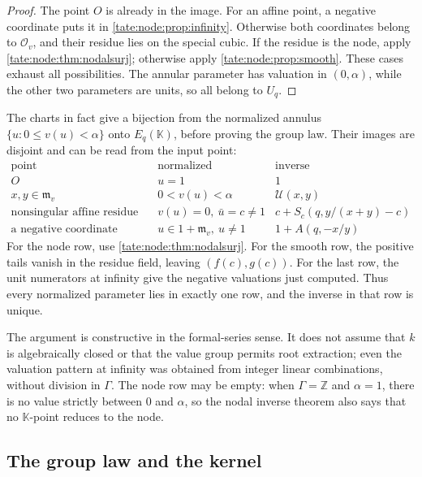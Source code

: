 \documentclass[11pt,letterpaper]{article}
\theoremstyle{definition}
\newcommand{\Z}{\mathbb Z}
\newcommand{\m}{\mathfrak m}
\newcommand{\OO}{\mathcal O}
\newcommand{\UU}{\mathcal U}
\newcommand{\KK}{\mathbb K}
\begin{document}
\begin{proof}
The point $O$ is already in the image. For an affine point, a negative
coordinate puts it in \cref{tate:node:prop:infinity}. Otherwise both
coordinates belong to $\OO_v$, and their residue lies on the special cubic.
If the residue is the node, apply \cref{tate:node:thm:nodalsurj};
otherwise apply \cref{tate:node:prop:smooth}. These cases exhaust all
possibilities. The annular parameter has valuation in $(0,\alpha)$, while
the other two parameters are units, so all belong to $U_q$.
\end{proof}

The charts in fact give a bijection from the normalized annulus
$\{u:0\le v(u)<\alpha\}$ onto $E_q(\KK)$, before proving the group law.
Their images are disjoint and can be read from the input point:
\[
\begin{array}{c|c|c}
 \text{point} & \text{normalized parameter} & \text{inverse}\\ \hline
 O & u=1 & 1\\
 x,y\in\m_v & 0<v(u)<\alpha & \UU(x,y)\\
 \text{nonsingular affine residue} & v(u)=0,\ \bar u=c\ne1
   & c+S_c(q,y/(x+y)-c)\\
 \text{a negative coordinate valuation} & u\in1+\m_v,\ u\ne1
   & 1+A(q,-x/y)
\end{array}
\]
For the node row, use \cref{tate:node:thm:nodalsurj}. For the smooth row,
the positive tails vanish in the residue field, leaving $(f(c),g(c))$.
For the last row, the unit numerators at infinity give the negative
valuations just computed. Thus every normalized parameter lies in exactly
one row, and the inverse in that row is unique.

The argument is constructive in the formal-series sense. It does not
assume that $k$ is algebraically closed or that the value group permits
root extraction; even the valuation pattern at infinity was obtained from
integer linear combinations, without division in $\Gamma$. The node row
may be empty: when $\Gamma=\Z$ and $\alpha=1$, there is no value strictly
between $0$ and $\alpha$, so the nodal inverse theorem also says that no
$\KK$-point reduces to the node.

\subsection{The group law and the kernel}
\end{document}
